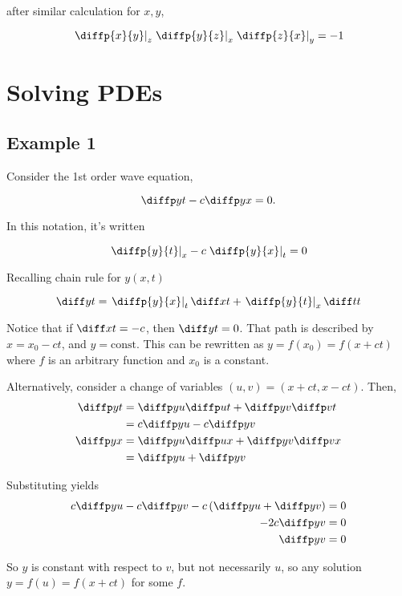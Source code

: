 \documentclass[12pt]{article}
\begin{document}
after similar calculation for $x,y$,

\[
    \left.\diffp{x}{y}\right|_{z}\left.\diffp{y}{z}\right|_{x}\left.\diffp{z}{x}\right|_{y} = -1
\]


\section{Solving PDEs}

\subsection{Example 1}

Consider the 1st order wave equation,

\[
    \diffp yt - c \diffp yx = 0.
\]

In this notation, it's written

\[
    \left.\diffp{y}{t}\right|_{x} - c\left.\diffp{y}{x}\right|_{t} = 0
\]

Recalling chain rule for $y(x,t)$

\[
\diff yt = \left.\diffp{y}{x}\right|_{t}\diff xt
        + \left.\diffp{y}{t}\right|_{x}\diff tt
\]

Notice that if $\diff xt = -c$, then $\diff yt = 0$.
That path is described by $x = x_{0} - ct$, and $y = \text{const}$.
This can be rewritten as $y = f(x_{0}) = f(x + ct)$ where $f$ is 
an arbitrary function and $x_{0}$ is a constant.

Alternatively, consider a change of variables $(u,v) = (x + ct, x - ct)$. Then,
\[
\begin{aligned}
    \diffp yt &= \diffp yu \diffp u t + \diffp yv \diffp v t \\
                &= c\diffp yu - c\diffp yv \\
    \diffp yx &= \diffp yu \diffp ux + \diffp yv \diffp vx \\
                &= \diffp yu + \diffp yv
\end{aligned}
\]

Substituting yields
\[
    \begin{aligned}
        c\diffp yu - c\diffp yv - c\left(\diffp yu + \diffp yv\right) &= 0 \\
        -2c\diffp yv &= 0 \\
        \diffp yv &= 0 \\
    \end{aligned}
\]

So $y$ is constant with respect to $v$, but not necessarily $u$, 
so any solution $y = f(u) = f(x + ct)$ for some $f$.
\end{document}
